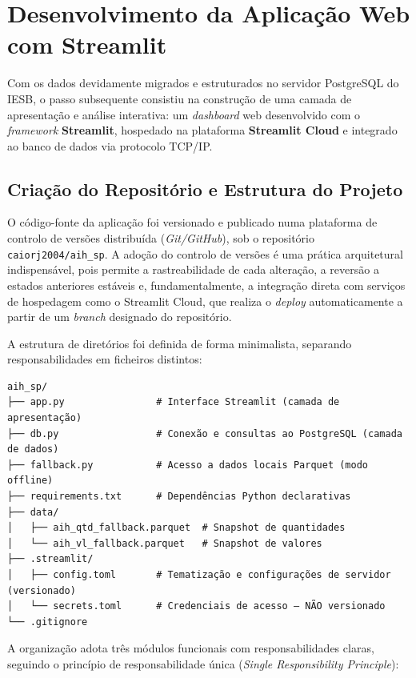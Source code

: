 \documentclass[12pt,a4paper]{report}
\begin{document}
\chapter{Desenvolvimento da Aplicação Web com Streamlit}

Com os dados devidamente migrados e estruturados no servidor PostgreSQL do IESB, o
passo subsequente consistiu na construção de uma camada de apresentação e análise
interativa: um \textit{dashboard} web desenvolvido com o \textit{framework}
\textbf{Streamlit}, hospedado na plataforma \textbf{Streamlit Cloud} e integrado ao
banco de dados via protocolo TCP/IP.

\section{Criação do Repositório e Estrutura do Projeto}

O código-fonte da aplicação foi versionado e publicado numa plataforma de controlo de
versões distribuída (\textit{Git/GitHub}), sob o repositório
\texttt{caiorj2004/aih\_sp}. A adoção do controlo de versões é uma prática
arquitetural indispensável, pois permite a rastreabilidade de cada alteração, a
reversão a estados anteriores estáveis e, fundamentalmente, a integração direta com
serviços de hospedagem como o Streamlit Cloud, que realiza o \textit{deploy}
automaticamente a partir de um \textit{branch} designado do repositório.

A estrutura de diretórios foi definida de forma minimalista, separando
responsabilidades em ficheiros distintos:

\begin{verbatim}
aih_sp/
├── app.py                # Interface Streamlit (camada de apresentação)
├── db.py                 # Conexão e consultas ao PostgreSQL (camada de dados)
├── fallback.py           # Acesso a dados locais Parquet (modo offline)
├── requirements.txt      # Dependências Python declarativas
├── data/
│   ├── aih_qtd_fallback.parquet  # Snapshot de quantidades
│   └── aih_vl_fallback.parquet   # Snapshot de valores
├── .streamlit/
│   ├── config.toml       # Tematização e configurações de servidor (versionado)
│   └── secrets.toml      # Credenciais de acesso — NÃO versionado
└── .gitignore
\end{verbatim}

A organização adota três módulos funcionais com responsabilidades claras, seguindo o
princípio de responsabilidade única (\textit{Single Responsibility Principle}):
\end{document}
